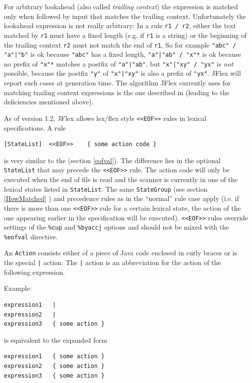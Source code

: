 \documentclass[11pt]{scrartcl}
\newcommand{\trit}{\em}
\begin{document}
\label{trailingContext}

For arbitrary lookahead (also called {\trit trailing context}) the 
expression is matched only when followed by input that matches the
trailing context. Unfortunately the lookahead expression is not
really arbitrary: In a rule \texttt{r1 / r2}, either the text matched
by \texttt{r1} must have a fixed length (e.g. if \texttt{r1} is a string)
or the beginning of the trailing context \texttt{r2} must not match the 
end of \texttt{r1}. So for example \verb+"abc" / "a"|"b"+ is ok because
\texttt{"abc"} has a fixed length, \verb+"a"|"ab" / "x"*+ is ok because
no prefix of \texttt{"x"*} matches a postfix of \verb+"a"|"ab"+, but
\verb+"x"|"xy" / "yx"+ is {\trit not} possible, because the postfix \texttt{"y"}
of \texttt{"x"|"xy"} is also a prefix of \texttt{"yx"}. JFlex will report
such cases at generation time. The algorithm JFlex currently uses for matching
trailing context expressions is the one described in \cite{Aho} (leading
to the deficiencies mentioned above).

\label{EOFRule}
As of version 1.2, JFlex allows lex/flex style \texttt{<<EOF>>} rules in
lexical specifications. A rule
\begin{verbatim}
[StateList]  <<EOF>>    { some action code }
\end{verbatim}
is very similar to the  (section \ref{eofval}). 
The difference lies in the optional \texttt{StateList} that may precede the \texttt{<<EOF>>} rule. The
action code will only be executed when the end of file is read and the
scanner is currently in one of the lexical states listed in \texttt{StateList}. 
The same \texttt{StateGroup} (see section \ref{HowMatched} 
) and precedence 
rules as in the ``normal'' rule case apply 
(i.e. if there is more than one \texttt{<<EOF>>} 
rule for a certain lexical state, the action of the one appearing 
earlier in the specification will be executed). \texttt{<<EOF>>} rules 
override settings of the \texttt{\%cup} and \texttt{\%byaccj} options and 
should not be mixed with the \texttt{\%eofval} directive.

An \texttt{Action} consists either of a piece of Java code enclosed in
curly braces or is the special \verb+|+ action. The \verb+|+ action is
an abbreviation for the action of the following expression.

Example:
\begin{verbatim}
expression1   |
expression2   |
expression3   { some action }
\end{verbatim}
is equivalent to the expanded form
\begin{verbatim}
expression1   { some action }
expression2   { some action }
expression3   { some action }
\end{verbatim}
\end{document}
